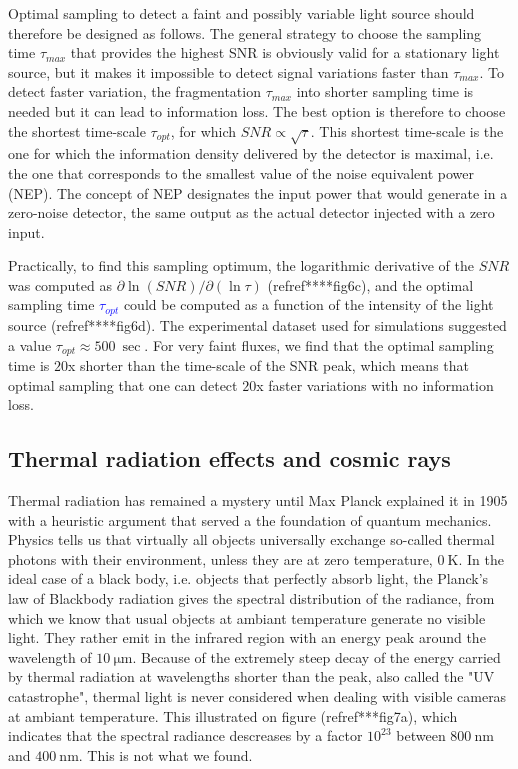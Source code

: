\documentclass{article}
\begin{document}
Optimal sampling to detect a faint and possibly variable light source should therefore be designed as follows. 
The general strategy to choose the sampling time $\tau_{max}$ that provides the highest SNR is obviously valid for a stationary light source, but it makes it impossible to detect signal variations faster than $\tau_{max}$.
To detect faster variation, the fragmentation $\tau_{max}$ into shorter sampling time is needed but it can lead to information loss.
The best option is therefore to choose the shortest time-scale $\tau_{opt}$, for which $SNR \propto \sqrt{\tau}$.
This shortest time-scale is the one for which the information density delivered by the detector is maximal, i.e. the one that corresponds to the smallest value of the noise equivalent power (NEP).
The concept of NEP designates the input power that would generate in a zero-noise detector, the same output as the actual detector injected with a zero input.


Practically, to find this sampling optimum, the logarithmic derivative of the $SNR$ was computed as $\partial \ln({SNR})/\partial( \ln{\tau})$ (refref****fig6c), and the optimal sampling time \textcolor{blue}{$\tau_{opt}$} could be computed as a function of the intensity of the light source (refref****fig6d).
The experimental dataset used for simulations suggested a value $\tau_{opt}\approx \SI{500}{\sec}$.
For very faint fluxes, we find that the optimal sampling time is $20$x shorter than the time-scale of the SNR peak, which means that optimal sampling that one can detect $20$x faster variations with no information loss.


\subsection*{Thermal radiation effects and cosmic rays}

Thermal radiation has remained a mystery until Max Planck explained it in 1905 with a heuristic argument that served a the foundation of quantum mechanics. 
Physics tells us that virtually all objects universally exchange so-called thermal photons with their environment, unless they are at zero temperature, $\SI{0}{\kelvin}$. 
In the ideal case of a black body, i.e. objects that perfectly absorb light, the Planck's law of Blackbody radiation gives the spectral distribution of the radiance, from which we know that usual objects at ambiant temperature generate no visible light.
They rather emit in the infrared region with an energy peak around the wavelength of $\SI{10}{\micro\meter}$.
Because of the extremely steep decay of the energy carried by thermal radiation at wavelengths shorter than the peak, also called the "UV catastrophe", thermal light is never considered when dealing with visible cameras at ambiant temperature.
This illustrated on figure (refref***fig7a), which indicates that the spectral radiance descreases by a factor $10^{23}$ between $\SI{800}{\nano\meter}$ and $\SI{400}{\nano\meter}$. 
This is not what we found. 
\end{document}
